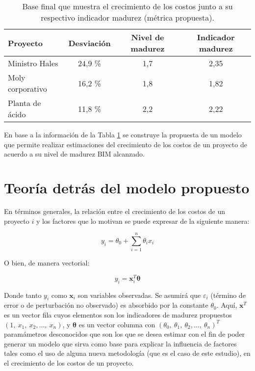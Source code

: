 \begin{table}[H]
    \centering
    \caption{Base final que muestra el crecimiento de los costos junto a su respectivo indicador madurez (métrica propuesta).}
    \label{tab:datosfinales}
    \begin{tabular}{lccc}
        \toprule 
        \textbf{Proyecto}  & \textbf{Desviación} & \textbf{Nivel de madurez} & \textbf{Indicador madurez} \\
        \midrule
        Ministro Hales     & 24,9 \%             & 1,7                       & 2,35 \\
        Moly corporativo   & 16,2 \%             & 1,8                       & 1,82 \\
        Planta de ácido    & 11,8 \%             & 2,2                       & 2,22 \\
        \bottomrule
    \end{tabular}
\end{table}


En base a la información de la Tabla \ref{tab:datosfinales} se construye la propuesta de un modelo que permite realizar estimaciones del crecimiento de los costos de un proyecto de acuerdo a su nivel de madurez BIM alcanzado.

\section{Teoría detrás del modelo propuesto}

En términos generales, la relación entre el crecimiento de los costos de un proyecto $i$ y los factores que lo motivan se puede expresar de la siguiente manera:

\begin{equation}
    \label{eq.desv-gen}
    y_i = \theta_0 +\sum\limits_{i=1}^n \theta_i x_i
\end{equation}

O bien, de manera vectorial:

\begin{equation}
    \label{eq.desv-vec}
    y_i = \bm{x}^T_i\bm{\theta}
\end{equation}

Donde tanto $y_i$ como $\bm{x}_i$ son variables observadas. Se asumirá que $\varepsilon_i$ (término de error o de perturbación no observado) es absorbido por la constante $\theta_0$. Aquí, $\bm{x}^T$ es un vector fila cuyos elementos son los indicadores de madurez propuestos $(1,~x_1,~x_2,\ldots,~x_n)$, y $\bm{\theta}$ es un vector columna con $(\theta_0,~\theta_1,~\theta_2,\ldots,~\theta_n)^T$  paramámetros desconocidos que son los que se desea estimar con el fin de poder generar un modelo que sirva como base para explicar la influencia de factores tales como el uso de alguna nueva metodología (que es el caso de este estudio), en el crecimiento de los costos de un proyecto.

